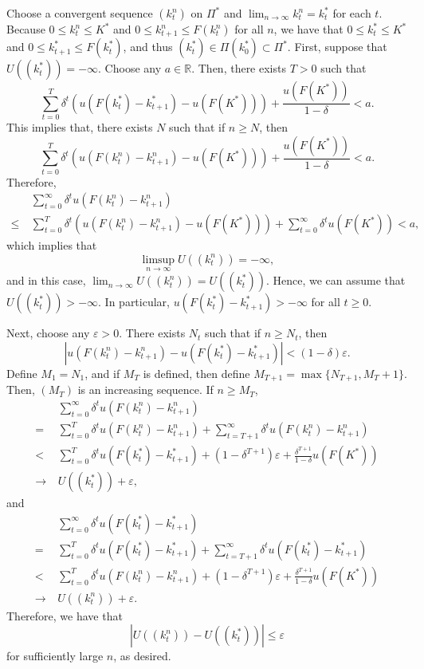 \documentclass[a4paper,12pt]{article}
\theoremstyle{definition}
\begin{document}
Choose a convergent sequence $(k_t^n)$ on $\Pi^*$ and $\lim_{n\to \infty}k_t^n=k_t^*$ for each $t$. Because $0\le k_t^n\le K^*$ and $0\le k_{t+1}^n\le F(k_t^n)$ for all $n$, we have that $0\le k_t^*\le K^*$ and $0\le k_{t+1}^*\le F(k_t^*)$, and thus $(k_t^*)\in \Pi(k_0^*)\subset \Pi^*$.  First, suppose that $U((k_t^*))=-\infty$. Choose any $a\in \mathbb{R}$. Then, there exists $T>0$ such that
\[\sum_{t=0}^T\delta^t(u(F(k_t^*)-k_{t+1}^*)-u(F(K^*)))+\frac{u(F(K^*))}{1-\delta}<a.\]
This implies that, there exists $N$ such that if $n\ge N$, then
\[\sum_{t=0}^T\delta^t(u(F(k_t^n)-k_{t+1}^n)-u(F(K^*)))+\frac{u(F(K^*))}{1-\delta}<a.\]
Therefore,
\begin{align*}
&~\sum_{t=0}^{\infty}\delta^tu(F(k_t^n)-k_{t+1}^n)\\
\le&~\sum_{t=0}^T\delta^t(u(F(k_t^n)-k_{t+1}^n)-u(F(K^*)))+\sum_{t=0}^{\infty}\delta^tu(F(K^*))<a,
\end{align*}
which implies that
\[\limsup_{n\to \infty}U((k_t^n))=-\infty,\]
and in this case, $\lim_{n\to \infty}U((k_t^n))=U((k_t^*))$. Hence, we can assume that $U((k_t^*))>-\infty$. In particular, $u(F(k_t^*)-k_{t+1}^*)>-\infty$ for all $t\ge 0$.

Next, choose any $\varepsilon>0$. There exists $N_t$ such that if $n\ge N_t$, then
\[|u(F(k_t^n)-k_{t+1}^n)-u(F(k_t^*)-k_{t+1}^*)|<(1-\delta)\varepsilon.\]
Define $M_1=N_1$, and if $M_T$ is defined, then define $M_{T+1}=\max\{N_{T+1},M_T+1\}$. Then, $(M_T)$ is an increasing sequence. If $n\ge M_T$,
\begin{align*}
&~\sum_{t=0}^{\infty}\delta^tu(F(k_t^n)-k_{t+1}^n)\\
=&~\sum_{t=0}^T\delta^tu(F(k_t^n)-k_{t+1}^n)+\sum_{t=T+1}^{\infty}\delta^tu(F(k_t^n)-k_{t+1}^n)\\
<&~\sum_{t=0}^T\delta^tu(F(k_t^*)-k_{t+1}^*)+(1-\delta^{T+1})\varepsilon+\frac{\delta^{T+1}}{1-\delta}u(F(K^*))\\
\to&~U((k_t^*))+\varepsilon,
\end{align*}
and
\begin{align*}
&~\sum_{t=0}^{\infty}\delta^tu(F(k_t^*)-k_{t+1}^*)\\
=&~\sum_{t=0}^T\delta^tu(F(k_t^*)-k_{t+1}^*)+\sum_{t=T+1}^{\infty}\delta^tu(F(k_t^*)-k_{t+1}^*)\\
<&~\sum_{t=0}^T\delta^tu(F(k_t^n)-k_{t+1}^n)+(1-\delta^{T+1})\varepsilon+\frac{\delta^{T+1}}{1-\delta}u(F(K^*))\\
\to&~U((k_t^n))+\varepsilon.
\end{align*}
Therefore, we have that
\[|U((k_t^n))-U((k_t^*))|\le \varepsilon\]
for sufficiently large $n$, as desired. 
\end{document}
